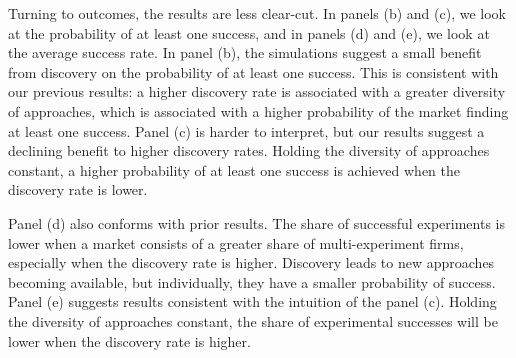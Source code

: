 Turning to outcomes, the results are less clear-cut. In panels (b) and (c), we look at the probability of at least one success, and in panels (d) and (e), we look at the average success rate. In panel (b), the simulations suggest a small benefit from discovery on the probability of at least one success. This is consistent with our previous results: a higher discovery rate is associated with a greater diversity of approaches, which is associated with a higher probability of the market finding at least one success. Panel (c) is harder to interpret, but our results suggest a declining benefit to higher discovery rates. Holding the diversity of approaches constant, a higher probability of at least one success is achieved when the discovery rate is lower. 

Panel (d) also conforms with prior results. The share of successful experiments is lower when a market consists of a greater share of multi-experiment firms, especially when the discovery rate is higher. Discovery leads to new approaches becoming available, but individually, they have a smaller probability of success. Panel (e) suggests results consistent with the intuition of the panel (c). Holding the diversity of approaches constant, the share of experimental successes will be lower when the discovery rate is higher.










